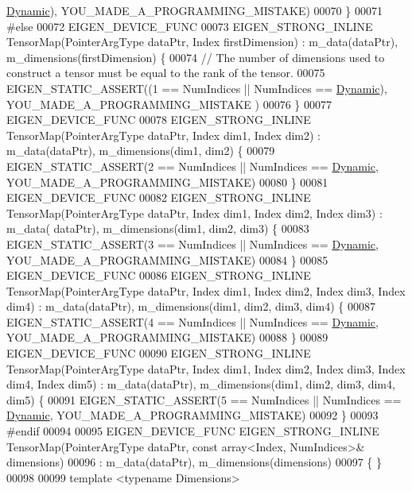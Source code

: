 \begin{DoxyCode}
      \hyperlink{namespace_eigen_ad81fa7195215a0ce30017dfac309f0b2}{Dynamic}), YOU\_MADE\_A\_PROGRAMMING\_MISTAKE)
00070     \}
00071 \textcolor{preprocessor}{#else}
00072     EIGEN\_DEVICE\_FUNC
00073     EIGEN\_STRONG\_INLINE TensorMap(PointerArgType dataPtr, Index firstDimension) : m\_data(dataPtr), 
      m\_dimensions(firstDimension) \{
00074       \textcolor{comment}{// The number of dimensions used to construct a tensor must be equal to the rank of the tensor.}
00075       EIGEN\_STATIC\_ASSERT((1 == NumIndices || NumIndices == \hyperlink{namespace_eigen_ad81fa7195215a0ce30017dfac309f0b2}{Dynamic}), YOU\_MADE\_A\_PROGRAMMING\_MISTAKE
      )
00076     \}
00077     EIGEN\_DEVICE\_FUNC
00078     EIGEN\_STRONG\_INLINE TensorMap(PointerArgType dataPtr, Index dim1, Index dim2) : m\_data(dataPtr), 
      m\_dimensions(dim1, dim2) \{
00079       EIGEN\_STATIC\_ASSERT(2 == NumIndices || NumIndices == \hyperlink{namespace_eigen_ad81fa7195215a0ce30017dfac309f0b2}{Dynamic}, YOU\_MADE\_A\_PROGRAMMING\_MISTAKE)
00080     \}
00081     EIGEN\_DEVICE\_FUNC
00082     EIGEN\_STRONG\_INLINE TensorMap(PointerArgType dataPtr, Index dim1, Index dim2, Index dim3) : m\_data(
      dataPtr), m\_dimensions(dim1, dim2, dim3) \{
00083       EIGEN\_STATIC\_ASSERT(3 == NumIndices || NumIndices == \hyperlink{namespace_eigen_ad81fa7195215a0ce30017dfac309f0b2}{Dynamic}, YOU\_MADE\_A\_PROGRAMMING\_MISTAKE)
00084     \}
00085     EIGEN\_DEVICE\_FUNC
00086     EIGEN\_STRONG\_INLINE TensorMap(PointerArgType dataPtr, Index dim1, Index dim2, Index dim3, Index dim4) :
       m\_data(dataPtr), m\_dimensions(dim1, dim2, dim3, dim4) \{
00087       EIGEN\_STATIC\_ASSERT(4 == NumIndices || NumIndices == \hyperlink{namespace_eigen_ad81fa7195215a0ce30017dfac309f0b2}{Dynamic}, YOU\_MADE\_A\_PROGRAMMING\_MISTAKE)
00088     \}
00089     EIGEN\_DEVICE\_FUNC
00090     EIGEN\_STRONG\_INLINE TensorMap(PointerArgType dataPtr, Index dim1, Index dim2, Index dim3, Index dim4, 
      Index dim5) : m\_data(dataPtr), m\_dimensions(dim1, dim2, dim3, dim4, dim5) \{
00091       EIGEN\_STATIC\_ASSERT(5 == NumIndices || NumIndices == \hyperlink{namespace_eigen_ad81fa7195215a0ce30017dfac309f0b2}{Dynamic}, YOU\_MADE\_A\_PROGRAMMING\_MISTAKE)
00092     \}
00093 \textcolor{preprocessor}{#endif}
00094 
00095    EIGEN\_DEVICE\_FUNC EIGEN\_STRONG\_INLINE TensorMap(PointerArgType dataPtr, \textcolor{keyword}{const} array<Index, NumIndices>& 
      dimensions)
00096       : m\_data(dataPtr), m\_dimensions(dimensions)
00097     \{ \}
00098 
00099     \textcolor{keyword}{template} <\textcolor{keyword}{typename} Dimensions>

\end{DoxyCode}
